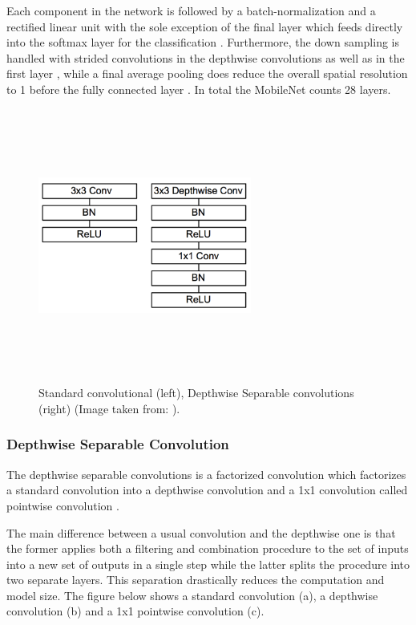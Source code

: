 Each component in the network is followed by a batch-normalization and a rectified linear unit with the sole exception of the final layer which feeds directly into the softmax layer for the classification \cite{paper:MobileNets}. Furthermore, the down sampling is handled with strided convolutions in the depthwise convolutions as well as in the first layer \cite{paper:MobileNets}, while a final average pooling does reduce the overall spatial resolution to 1 before the fully connected layer \cite{paper:MobileNets}. In total the MobileNet counts 28 layers.

\begin{figure}[!htbp]
\begin{center}
\includegraphics[width=7cm,height=9cm,keepaspectratio]{images/mobileNet_contrast.png}
\end{center}
\caption{Standard convolutional (left), Depthwise Separable convolutions (right) (Image taken from: \cite{paper:MobileNets}).}
\end{figure}

\subsubsection{Depthwise Separable Convolution}

The depthwise separable convolutions is a factorized convolution which factorizes a standard convolution into a depthwise convolution and a 1x1 convolution called pointwise convolution \cite{paper:MobileNets}.

The main difference between a usual convolution and the depthwise one is that the former applies both a filtering and combination procedure to the set of inputs into a new set of outputs in a single step \cite{paper:MobileNets} while the latter splits the procedure into two separate layers. This separation drastically reduces the computation and model size. The figure below shows a standard convolution (a), a depthwise convolution (b) and a 1x1 pointwise convolution (c).

